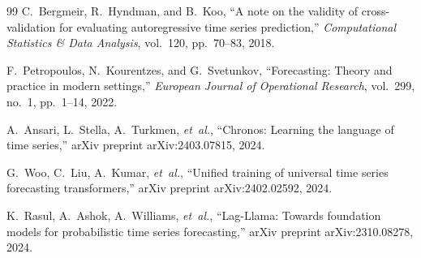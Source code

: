 \documentclass[journal]{IEEEtran}
\begin{document}
\begin{thebibliography}{99}
C.~Bergmeir, R.~Hyndman, and B.~Koo,
``A note on the validity of cross-validation for evaluating autoregressive time series prediction,''
\emph{Computational Statistics \& Data Analysis}, vol.~120, pp.~70--83, 2018.

F.~Petropoulos, N.~Kourentzes, and G.~Svetunkov,
``Forecasting: Theory and practice in modern settings,''
\emph{European Journal of Operational Research}, vol.~299, no.~1, pp.~1--14, 2022.

A.~Ansari, L.~Stella, A.~Turkmen, \emph{et~al.},
``Chronos: Learning the language of time series,''
arXiv preprint arXiv:2403.07815, 2024.

G.~Woo, C.~Liu, A.~Kumar, \emph{et~al.},
``Unified training of universal time series forecasting transformers,''
arXiv preprint arXiv:2402.02592, 2024.

K.~Rasul, A.~Ashok, A.~Williams, \emph{et~al.},
``Lag-Llama: Towards foundation models for probabilistic time series forecasting,''
arXiv preprint arXiv:2310.08278, 2024.

\end{thebibliography}
\end{document}

